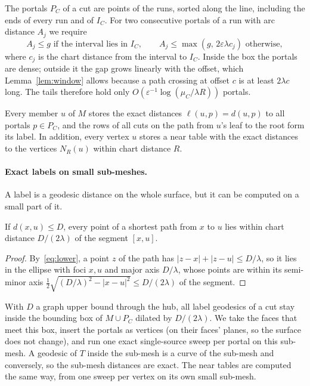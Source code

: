 \documentclass[sigconf,nonacm,screen]{acmart}
\newcommand{\eps}{\varepsilon}
\begin{document}
The portals $P_C$ of a cut are points of the runs, sorted along the line, including the ends of every run and
of $I_C$. For two consecutive portals of a run with arc distance $A_j$ we require
\begin{equation}
A_j \le g \text{ if the interval lies in } I_C, \qquad A_j\le\max(g,\,2\eps\lambda c_j)\text{ otherwise},
\label{eq:gaps}
\end{equation}
where $c_j$ is the chart distance from the interval to $I_C$. Inside the box the portals are dense; outside
it the gap grows linearly with the offset, which Lemma~\ref{lem:window} allows because a path crossing at
offset $c$ is at least $2\lambda c$ long. The tails therefore hold only $O(\eps^{-1}\log(\mu_C/\lambda R))$
portals.

Every member $u$ of $M$ stores the exact distances $\ell(u,p)=d(u,p)$ to all portals $p\in P_C$, and the
rows of all cuts on the path from $u$'s leaf to the root form its label. In addition, every vertex $u$ stores a
near table with the exact distances to the vertices $N_R(u)$ within chart distance $R$.

\paragraph{Exact labels on small sub-meshes.}
A label is a geodesic distance on the whole surface, but it can be computed on a small part of it.
\begin{lemma}[ellipse]
\label{lem:ellipse}
If $d(x,u)\le D$, every point of a shortest path from $x$ to $u$ lies within chart distance $D/(2\lambda)$ of
the segment $[x,u]$.
\end{lemma}
\begin{proof}
By~\eqref{eq:lower}, a point $z$ of the path has $|z-x|+|z-u|\le D/\lambda$, so it lies in the ellipse with foci
$x,u$ and major axis $D/\lambda$, whose points are within its semi-minor axis
$\frac12\sqrt{(D/\lambda)^2-|x-u|^2}\le D/(2\lambda)$ of the segment.
\end{proof}
With $D$ a graph upper bound through the hub, all label geodesics of a cut stay inside the bounding box of
$M\cup P_C$ dilated by $D/(2\lambda)$. We take the faces that meet this box, insert the portals as vertices
(on their faces' planes, so the surface does not change), and run one exact single-source sweep per portal
on this sub-mesh. A geodesic of $T$ inside the sub-mesh is a curve of the sub-mesh and conversely, so the
sub-mesh distances are exact. The near tables are computed the same way, from one sweep per vertex on its
own small sub-mesh.
\end{document}

